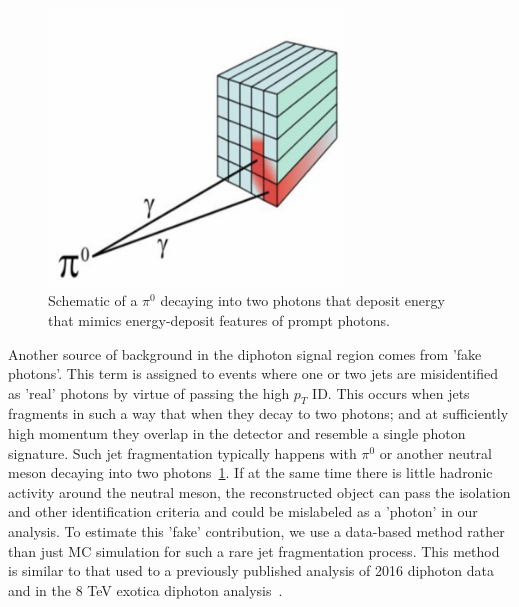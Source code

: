 \begin{figure}[tbp!]
\begin{center}
\includegraphics[angle=0,width=0.7\textwidth]{fig/SchematicOfJetFakingPhoton.png}
\end{center}
\caption{Schematic of a $\pi^{0}$ decaying into two photons that deposit energy that mimics energy-deposit features of prompt photons.}
\label{fig:pi0Decay}
\end{figure}

Another source of background in the diphoton signal region comes from 'fake photons'. This term is assigned to events where one or two jets are misidentified as 'real' photons by virtue of passing the high $p_T$ ID. This occurs when jets fragments in such a way that when they decay to two photons; and at sufficiently high momentum they overlap in the detector and resemble a single photon signature. Such jet fragmentation typically happens with $\pi^{0}$ or another neutral meson decaying into two photons~\ref{fig:pi0Decay}. If at the same time there is little hadronic activity around the neutral meson, the reconstructed object can pass the isolation and other identification criteria and could be mislabeled as a 'photon' in our analysis. To estimate this 'fake' contribution, we use a data-based method rather than just MC simulation for such a rare jet fragmentation  process. This method is similar to that used to a previously published analysis of 2016 diphoton data~\cite{Sirunyan:2018wnk} and in the 8 TeV exotica diphoton analysis~\cite{CMS-PAS-EXO-12-045}.

